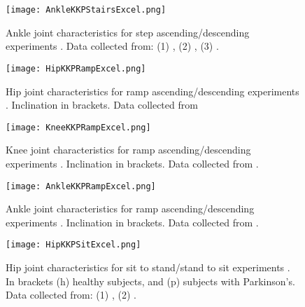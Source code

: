 \begin{figure}[htbp]
    \centering
    \texttt{[image: AnkleKKPStairsExcel.png]}
    \caption[Ankle joint characteristics for step ascending/descending experiments.]{Ankle joint characteristics for step ascending/descending experiments \cite{solis2017characterization}. Data collected from: (1) \cite{protopapadaki2007hip}, (2) \cite{riener2002stair}, (3) \cite{reid2007knee}. }
    \label{fig:ankleKKPStairs}
\end{figure}

\begin{figure}[htbp]
    \centering
    \texttt{[image: HipKKPRampExcel.png]}
    \caption[Hip joint characteristics for ramp ascending/descending experiments. Inclination in brackets.]{Hip joint characteristics for ramp ascending/descending experiments \cite{solis2017characterization}. Inclination in brackets. Data collected from \cite{mcintosh2006gait}}
    \label{fig:hipKKPRamp}
\end{figure}

\begin{figure}[htbp]
    \centering
    \texttt{[image: KneeKKPRampExcel.png]}
    \caption[Knee joint characteristics for ramp ascending/descending experiments. Inclination in brackets.]{Knee joint characteristics for ramp ascending/descending experiments \cite{solis2017characterization}. Inclination in brackets. Data collected from \cite{mcintosh2006gait}. }
    \label{fig:kneeKKPRamp}
\end{figure}

\begin{figure}[htbp]
    \centering
    \texttt{[image: AnkleKKPRampExcel.png]}
    \caption[Ankle joint characteristics for ramp ascending/descending experiments. Inclination in brackets.]{Ankle joint characteristics for ramp ascending/descending experiments \cite{solis2017characterization}. Inclination in brackets. Data collected from \cite{mcintosh2006gait}.}
    \label{fig:ankleKKPRamp}
\end{figure}

\begin{figure}[htbp]
    \centering
    \texttt{[image: HipKKPSitExcel.png]}
    \caption[Hip joint characteristics for sit to stand/stand to sit experiments. In brackets (h) healthy subjects, and (p) subjects with Parkinson's.]{Hip joint characteristics for sit to stand/stand to sit experiments \cite{solis2017characterization}. In brackets (h) healthy subjects, and (p) subjects with Parkinson's. Data collected from: (1) \cite{roebroeck1994biomechanics}, (2) \cite{mak2003joint}.  }
    \label{fig:hipKKPSit}
\end{figure}

